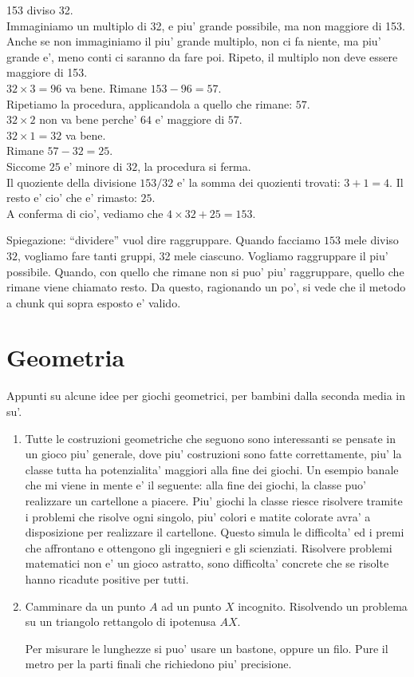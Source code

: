 \documentclass[a4paper]{article}
\begin{document}
\begin{exemp}
	153 diviso 32.\\
	Immaginiamo un multiplo di 32, e piu' grande possibile, ma non maggiore di 153. Anche se non immaginiamo il piu' grande multiplo, non ci fa niente, ma piu' grande e', meno conti ci saranno da fare poi. Ripeto, il multiplo non deve essere maggiore di 153.\\
	$32\times 3 = 96$ va bene.
	Rimane $153 - 96 = 57$.\\
	Ripetiamo la procedura, applicandola a quello che rimane: $57$.\\
	$32 \times 2$ non va bene perche' $64$ e' maggiore di $57$.\\
	$32 \times 1 = 32$ va bene.\\
	Rimane $57-32=25$.\\
	Siccome $25$ e' minore di $32$, la procedura si ferma.\\
	Il quoziente della divisione $153 / 32$ e' la somma dei quozienti trovati: $3+1=4$. Il resto e' cio' che e' rimasto: $25$.\\
	A conferma di cio', vediamo che $4\times 32 + 25 = 153$.	
\end{exemp}

Spiegazione: ``dividere'' vuol dire raggruppare. Quando facciamo $153$ mele diviso $32$, vogliamo fare tanti gruppi, 32 mele ciascuno. Vogliamo raggruppare il piu' possibile. Quando, con quello che rimane non si puo' piu' raggruppare, quello che rimane viene chiamato resto. Da questo, ragionando un po', si vede che il metodo a chunk qui sopra esposto e' valido.

\section{Geometria}
Appunti su alcune idee per giochi geometrici, per bambini dalla seconda media in su'.
\begin{enumerate}

    \item Tutte le costruzioni geometriche che seguono sono interessanti se pensate in un gioco piu' generale, dove piu' costruzioni sono fatte correttamente, piu' la classe tutta ha potenzialita' maggiori alla fine dei giochi. Un esempio banale che mi viene in mente e' il seguente: alla fine dei giochi, la classe puo' realizzare un cartellone a piacere. Piu' giochi la classe riesce risolvere tramite i problemi che risolve ogni singolo, piu' colori e matite colorate avra' a disposizione per realizzare il cartellone. Questo simula le difficolta' ed i premi che affrontano e ottengono gli ingegnieri e gli scienziati. Risolvere problemi matematici non e' un gioco astratto, sono difficolta' concrete che se risolte hanno ricadute positive per tutti.

    \item Camminare da un punto $A$ ad un punto $X$ incognito. Risolvendo un problema su un triangolo rettangolo di ipotenusa $AX$.

        Per misurare le lunghezze si puo' usare un bastone, oppure un filo. Pure il metro per la parti finali che richiedono piu' precisione.

        
\end{enumerate}


\printindex
\end{document}
